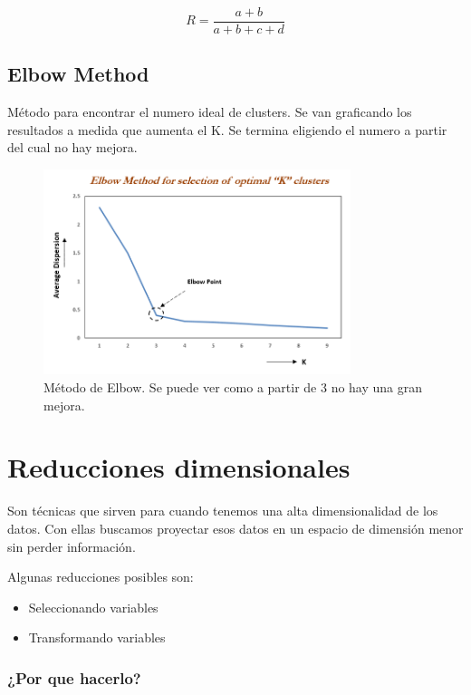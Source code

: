 \documentclass[titlepage,a4paper]{article}
\begin{document}
\begin{equation}
    R = \frac{a+b}{a+b+c+d}
\end{equation}

\subsection{Elbow Method}
Método para encontrar el numero ideal de clusters. Se van graficando los resultados a medida que aumenta el K. Se termina eligiendo el numero a partir del cual no hay mejora.

\begin{figure}[!htb]
    \centering
    \includegraphics[width=0.8\textwidth]{imagenesResumen/ElbowMethod.png}
    \caption{Método de Elbow. Se puede ver como a partir de 3 no hay una gran mejora.}
\end{figure}

\newpage

\section{Reducciones dimensionales}

Son técnicas que sirven para cuando tenemos una alta dimensionalidad de los datos. Con ellas buscamos proyectar esos datos en un espacio de dimensión menor sin perder información. 

Algunas reducciones posibles son:
\begin{itemize}
    \item Seleccionando variables
    \item Transformando variables
\end{itemize}

\subsubsection*{¿Por que hacerlo?}
\end{document}
